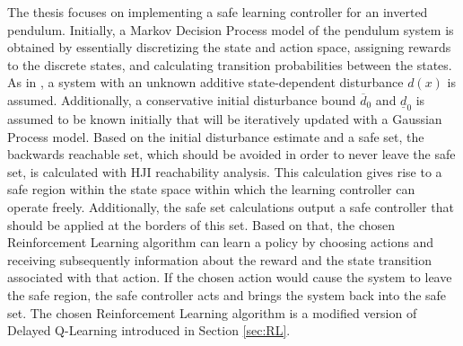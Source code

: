 \documentclass[../main.tex]{subfiles}
\begin{document}
The thesis focuses on implementing a safe learning controller for an inverted pendulum. Initially, a Markov Decision Process model of the pendulum system is obtained by essentially discretizing the state and action space, assigning rewards to the discrete states, and calculating transition probabilities between the states. As in \cite{akametalu2014reachability}, a system with an unknown additive state-dependent disturbance $d(x)$ is assumed. Additionally, a conservative initial disturbance bound $\overline{d}_0$ and $\underline{d}_0$ is assumed to be known initially that will be iteratively updated with a Gaussian Process model. Based on the initial disturbance estimate and a safe set, the backwards reachable set, which should be avoided in order to never leave the safe set, is calculated with HJI reachability analysis. This calculation gives rise to a safe region within the state space within which the learning controller can operate freely. Additionally, the safe set calculations output a safe controller that should be applied at the borders of this set. Based on that, the chosen Reinforcement Learning algorithm can learn a policy by choosing actions and receiving subsequently information about the reward and the state transition associated with that action. If the chosen action would cause the system to leave the safe region, the safe controller acts and brings the system back into the safe set. The chosen Reinforcement Learning algorithm is a modified version of Delayed Q-Learning introduced in Section \ref{sec:RL}.
\end{document}
